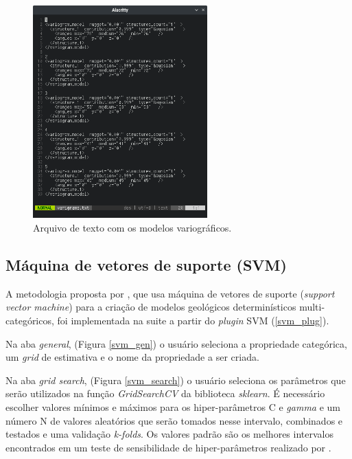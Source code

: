 \begin{figure}[H]
	\caption{\label{vario_model_txt}Arquivo de texto com os modelos variográficos.}
	\centering
		\includegraphics[width=0.6\textwidth]{apendice_a/imagens/variograms.png}
\end{figure}

\subsection{Máquina de vetores de suporte (SVM)}

A metodologia proposta por , que usa máquina de vetores de suporte (\textit{support vector machine}) para a criação de modelos geológicos determinísticos multi-categóricos, foi implementada na suite a partir do \textit{plugin} SVM (\autoref{svm_plug}).

Na aba \textit{general}, (Figura \autoref{svm_gen}) o usuário seleciona a propriedade categórica, um \textit{grid} de estimativa e o nome da propriedade a ser criada.

Na aba \textit{grid search}, (Figura \autoref{svm_search}) o usuário seleciona os parâmetros que serão utilizados na função \textit{GridSearchCV} da biblioteca \textit{sklearn}. É necessário escolher valores mínimos e máximos para os hiper-parâmetros C e \textit{gamma} e um número N de valores aleatórios que serão tomados nesse intervalo, combinados e testados e uma validação \textit{k-folds}. Os valores padrão são os melhores intervalos encontrados em um teste de sensibilidade de hiper-parâmetros realizado por .

